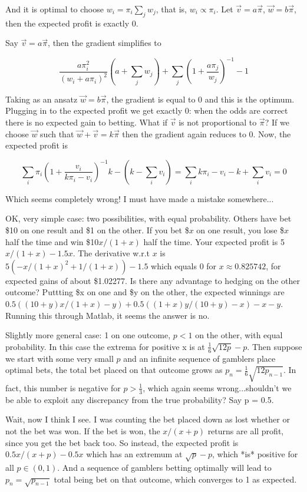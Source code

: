 \documentclass[11pt]{article}
\begin{document}
And it is optimal to choose $w_i = \pi_i \sum_j w_j$, that is, $w_i \propto \pi_i$.  Let $\vec{v} = a\vec{\pi}$, $\vec{w} = b\vec{\pi}$, then the expected profit is exactly 0.

Say $\vec{v} = a\vec{\pi}$, then the gradient simplifies to 

\[ \frac{a\pi_i^2}{(w_i + a\pi_i)^2} \left(a + \sum_j w_j\right) + \sum_j \left(1+ \frac{a\pi_j}{w_j}\right)^{-1} - 1 \]

Taking as an ansatz $\vec{w} = b\vec{\pi}$, the gradient is equal to 0 and this is the optimum.  Plugging in to the expected profit we get exactly 0: when the odds are correct there is no expected gain to betting.  What if $\vec{v}$ is not proportional to $\vec{\pi}$?  If we choose $\vec{w}$ such that $\vec{w} + \vec{v} = k\vec{\pi}$ then the gradient again reduces to 0.  Now, the expected profit is

\[ \sum_i \pi_i \left(1 + \frac{v_i}{k\pi_i - v_i}\right)^{-1}k - \left(k - \sum_i v_i\right) = \sum_i  k\pi_i - v_i - k + \sum_i v_i = 0\]

Which seems completely wrong!  I must have made a mistake somewhere...

OK, very simple case: two possibilities, with equal probability.  Others have bet \$10 on one result and \$1 on the other.  If you bet \$$x$ on one result, you lose \$$x$ half the time and win \$10$x/(1+x)$ half the time.  Your expected profit is 5$x/(1+x) - 1.5x$.  The derivative w.r.t $x$ is $5(-x/(1+x)^2 + 1/(1+x)) - 1.5$ which equals 0 for $x \approx 0.825742$, for expected gains of about \$1.02277.  Is there any advantage to hedging on the other outcome?  Puttting \$x on one and \$y on the other, the expected winnings are $0.5((10+y)x/(1+x) - y) + 0.5((1+x)y/(10+y) - x) - x - y$.  Running this through Matlab, it seems the answer is no.

Slightly more general case: 1 on one outcome, $p < 1$ on the other, with equal probability.  In this case the extrema for positive x is at $\frac{1}{6}\sqrt{12p}-p$.  Then suppose we start with some very small $p$ and an infinite sequence of gamblers place optimal bets, the total bet placed on that outcome grows as $p_n = \frac{1}{6}\sqrt{12p_{n-1}}$.  In fact, this number is negative for $p > \frac{1}{3}$, which again seems wrong...shouldn't we be able to exploit any discrepancy from the true probability?  Say p = 0.5.  

Wait, now I think I see.  I was counting the bet placed down as lost whether or not the bet was won.  If the bet is won, the $x/(x+p)$ returns are all profit, since you get the bet back too.  So instead, the expected profit is $0.5 x/(x+p) - 0.5x$ which has an extremum at $\sqrt{p}-p$, which *is* positive for all $p \in (0,1)$.  And a sequence of gamblers betting optimally will lead to $p_n = \sqrt{p_{n-1}}$ total being bet on that outcome, which converges to 1 as expected.
\end{document}
